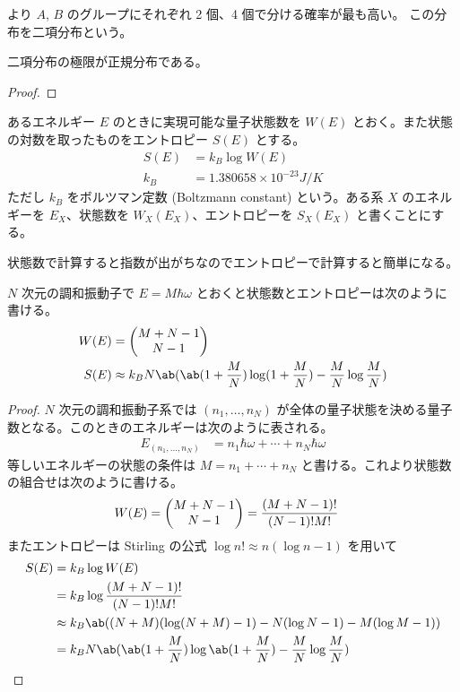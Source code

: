 \documentclass[a4paper,11pt]{jlreq}
\begin{document}
より $A$, $B$ のグループにそれぞれ 2 個、4 個で分ける確率が最も高い。
この分布を二項分布という。

\begin{proposition}
  二項分布の極限が正規分布である。
\end{proposition}
\begin{proof}
\end{proof}

\begin{definition}
  あるエネルギー $E$ のときに実現可能な量子状態数を $W(E)$ とおく。また状態の対数を取ったものをエントロピー $S(E)$ とする。
  \begin{align}
    S(E) & = k_B\log W(E)                     \\
    k_B  & = 1.380658\times 10^{-23} \si{J/K}
  \end{align}
  ただし $k_B$ をボルツマン定数 (Boltzmann constant) という。ある系 $X$ のエネルギーを $E_X$、状態数を $W_X(E_X)$、エントロピーを $S_X(E_X)$ と書くことにする。
\end{definition}
状態数で計算すると指数が出がちなのでエントロピーで計算すると簡単になる。

\begin{theorem}
  $N$ 次元の調和振動子で $E = M\hbar\omega$ とおくと状態数とエントロピーは次のように書ける。
  \begin{align}
    W(E) & = \mqty{M + N - 1                                                                       \\ N - 1} \\
    S(E) & \approx k_BN\ab(\ab(1 + \frac{M}{N})\log(1 + \frac{M}{N}) - \frac{M}{N}\log\frac{M}{N})
  \end{align}
\end{theorem}
\begin{proof}
  $N$ 次元の調和振動子系では $(n_1,\ldots,n_N)$ が全体の量子状態を決める量子数となる。このときのエネルギーは次のように表される。
  \begin{align}
    E_{(n_1,\ldots,n_N)} & = n_1\hbar\omega + \cdots + n_N\hbar\omega
  \end{align}
  等しいエネルギーの状態の条件は $M = n_1 + \cdots + n_N$ と書ける。これより状態数の組合せは次のように書ける。
  \begin{align}
    W(E) & = \begin{pmatrix}M + N - 1 \\ N - 1\end{pmatrix} = \frac{(M + N - 1)!}{(N - 1)!M!}
  \end{align}
  またエントロピーは Stirling の公式 $\log n! \approx n(\log n - 1)$ を用いて
  \begin{align}
    S(E) & = k_B\log W(E)                                                                       \\
         & = k_B\log\frac{(M + N - 1)!}{(N - 1)!M!}                                             \\
         & \approx k_B\ab((N + M)(\log(N + M) - 1) - N(\log N - 1) - M(\log M - 1))             \\
         & = k_BN\ab(\ab(1 + \frac{M}{N})\log\ab(1 + \frac{M}{N}) - \frac{M}{N}\log\frac{M}{N})
  \end{align}
\end{proof}
\end{document}
